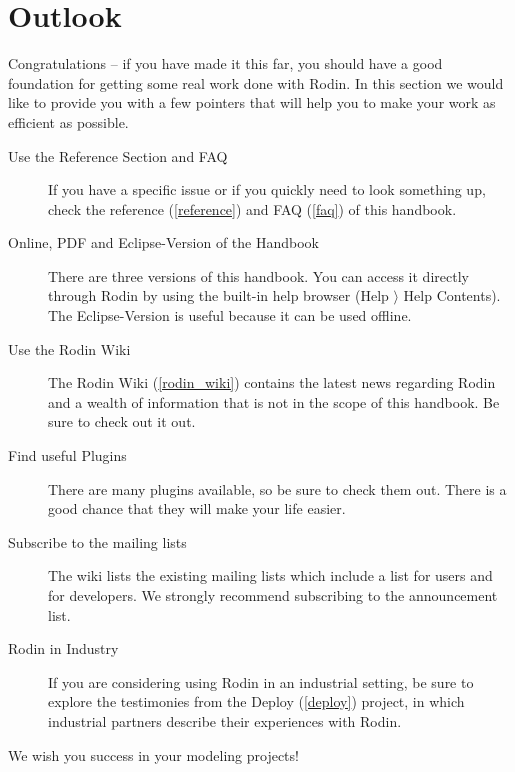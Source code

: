 \section{Outlook}
\label{tut_outlook}

Congratulations -- if you have made it this far, you should have a good foundation for getting some real work done with Rodin.  In this section we would like to provide you with a few pointers that will help you to make your work as efficient as possible.

\begin{description}
	\item[Use the Reference Section and FAQ] If you have a specific issue or if you quickly need to look something up, check the reference (\ref{reference}) and FAQ (\ref{faq}) of this handbook.
	\item[Online, PDF and Eclipse-Version of the Handbook] There are three versions of this handbook.  You can access it directly through Rodin by using the built-in help browser (\textsf{Help $\rangle$ Help Contents}).  The Eclipse-Version is useful because it can be used offline.
	\item[Use the Rodin Wiki] The Rodin Wiki (\ref{rodin_wiki}) contains the latest news regarding Rodin and a wealth of information that is not in the scope of this handbook.  Be sure to check out it out.
	\item[Find useful Plugins] There are many plugins available, so be sure to check them out.  There is a good chance that they will make your life easier.
	\item[Subscribe to the mailing lists] The wiki lists the existing mailing lists which include a list for users and for developers.  We strongly recommend subscribing to the announcement list.
	\item[Rodin in Industry] If you are considering using Rodin in an industrial setting, be sure to explore the testimonies from the Deploy (\ref{deploy}) project, in which industrial partners describe their experiences with Rodin.
\end{description}

We wish you success in your modeling projects!

